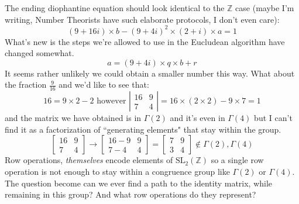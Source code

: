 \documentclass[12pt]{article}
\begin{document}
The ending diophantine equation should look identical to the $\mathbb{Z}$ case (maybe I'm writing, Number Theorists have such elaborate protocols, I don't even care):
$$  (9+16i) \times b - (9+4i)^2 \times (2+i) \times a = 1 $$
What's new is the steps we're allowed to use in the Eucludean algorithm have changed somewhat.  
$$ a = (9+4i) \times q \times b + r$$
It seems rather unlikely we could obtain a smaller number this way.  What about the fraction $\frac{9}{16}$ and we'd like to see that:
$$16 = 9 \times 2 - 2 \text{ however } \left|\begin{array}{rr} 16 & 9 \\
7 & 4 \end{array}\right| = 16 \times ( 2 \times 2) - 9 \times 7 = 1 $$ 
and the matrix we have obtained is in $\Gamma(2)$ and it's even in $\Gamma(4)$ but I can't find it as a factorization of ``generating elements" that stay within the group.
$$
\left[\begin{array}{rr} 16 & 9 \\
7 & 4 \end{array}\right] \to
\left[\begin{array}{rr} 16 - 9 & 9 \\
7 -4 & 4 \end{array}\right] = 
\left[\begin{array}{rr} 7 & 9 \\
3 & 4 \end{array}\right] \notin \Gamma(2), \Gamma(4)
 $$
Row operations, \textit{themselves} encode elements of $\text{SL}_2(\mathbb{Z})$ so a single row operation is not enough to stay within a congruence group like $\Gamma(2)$ or $\Gamma(4)$.  The question become can we ever find a path to the identity matrix, while remaining in this group? And what row operations do they represent?
\end{document}
